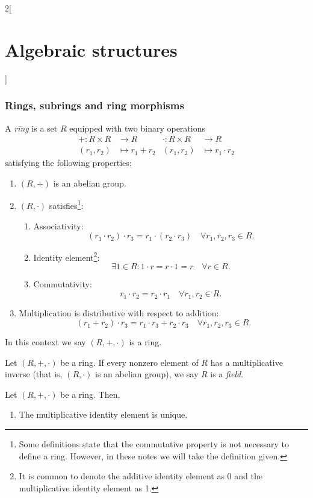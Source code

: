 \documentclass[../../../main.tex]{subfiles}
\begin{document}
\begin{multicols}{2}[\section{Algebraic structures}]
\subsubsection*{Rings, subrings and ring morphisms}
\begin{definition}[Ring]
    A \textit{ring} is a set $R$ equipped with two binary operations \begin{align*}
        +:R\times R&\longrightarrow R&\cdot:R\times R&\longrightarrow R\\
        (r_1,r_2)&\longmapsto r_1+ r_2&(r_1,r_2)&\longmapsto r_1\cdot r_2
    \end{align*}
    satisfying the following properties:
    \begin{enumerate}
        \item $(R,+)$ is an abelian group.
        \item $(R,\cdot)$ satisfies\footnote{Some definitions state that the commutative property is not necessary to define a ring. However, in these notes we will take the definition given.}:
        \begin{enumerate}
            \item Associativity: $$(r_1\cdot r_2)\cdot r_3=r_1\cdot(r_2\cdot r_3)\quad\forall r_1,r_2,r_3\in R.$$
            \item Identity element\footnote{It is common to denote the additive identity element as 0 and the multiplicative identity element as 1.}: $$\exists 1\in R:1\cdot r=r\cdot 1=r\quad\forall r\in R.$$
            \item Commutativity: $$r_1\cdot r_2=r_2\cdot r_1\quad\forall r_1,r_2\in R.$$
        \end{enumerate}
        \item Multiplication is distributive with respect to addition: $$(r_1+r_2)\cdot r_3=r_1\cdot r_3+r_2\cdot r_3\quad\forall r_1,r_2,r_3\in R.$$
    \end{enumerate}
    In this context we say $(R,+,\cdot)$ is a ring.
\end{definition}
\begin{definition}[Field]
    Let $(R,+,\cdot)$ be a ring. If every nonzero element of $R$ has a multiplicative inverse (that is, $(R,\cdot)$ is an abelian group), we say $R$ is a \textit{field}.
\end{definition}
\begin{lemma}
    Let $(R,+,\cdot)$ be a ring. Then,
    \begin{enumerate}
        \item The multiplicative identity element is unique.

\end{enumerate}
\end{lemma}
\end{multicols}
\end{document}

